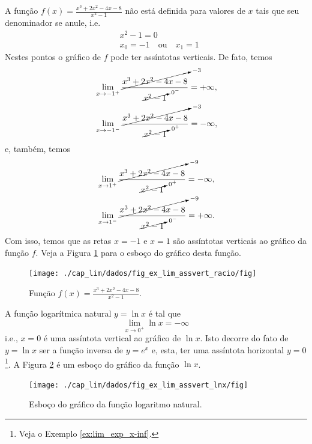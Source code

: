 \begin{ex}
  A função $\displaystyle f(x) = \frac{x^3 + 2x^2 - 4x - 8}{x^2 - 1}$ não está definida para valores de $x$ tais que seu denominador se anule, i.e.
    \begin{align}
      & x^2 - 1 = 0 \\
      & x_0=-1\quad\text{ou}\quad x_1=1
    \end{align}
    Nestes pontos o gráfico de $f$ pode ter assíntotas verticais. De fato, temos
    \begin{align}
      & \lim_{x\to -1^+} \frac{\cancelto{-3}{x^3 + 2x^2 - 4x - 8}}{\cancelto{0^-}{x^2-1}} =  +\infty,\\
      & \lim_{x\to -1^-} \frac{\cancelto{-3}{x^3 + 2x^2 - 4x - 8}}{\cancelto{0^+}{x^2-1}} =  -\infty,
    \end{align}
    e, também, temos
    \begin{align}
      & \lim_{x\to 1^+} \frac{\cancelto{-9}{x^3 + 2x^2 - 4x - 8}}{\cancelto{0^+}{x^2-1}} = -\infty,\\      
      & \lim_{x\to 1^-} \frac{\cancelto{-9}{x^3 + 2x^2 - 4x - 8}}{\cancelto{0^-}{x^2-1}} = +\infty.
    \end{align}
    Com isso, temos que as retas $x=-1$ e $x=1$ são assíntotas verticais ao gráfico da função $f$. Veja a Figura \ref{fig:ex_lim_assvert_racio} para o esboço do gráfico desta função.

    \begin{figure}[H]
      \centering
      \texttt{[image: ./cap\_lim/dados/fig\_ex\_lim\_assvert\_racio/fig]}
      \caption{Função $\displaystyle f(x) = \frac{x^3 + 2x^2 - 4x - 8}{x^2 - 1}$.}
      \label{fig:ex_lim_assvert_racio}
    \end{figure}
\end{ex}

\begin{ex}
  A função logarítmica natural $y = \ln x$ é tal que
  \begin{equation}
    \lim_{x\to 0^+} \ln x = -\infty
  \end{equation}
  i.e., $x=0$ é uma assíntota vertical ao gráfico de $\ln x$. Isto decorre do fato de $y = \ln x$ ser a função inversa de $y = e^x$ e, esta, ter uma assíntota horizontal $y=0$\footnote{Veja o Exemplo \ref{ex:lim_exp_x-inf}.}. A Figura \ref{fig:ex_lim_assvert_lnx} é um esboço do gráfico da função  $\ln x$.

    \begin{figure}[H]
      \centering
      \texttt{[image: ./cap\_lim/dados/fig\_ex\_lim\_assvert\_lnx/fig]}
      \caption{Esboço do gráfico da função logaritmo natural.}
      \label{fig:ex_lim_assvert_lnx}
    \end{figure}  
\end{ex}

